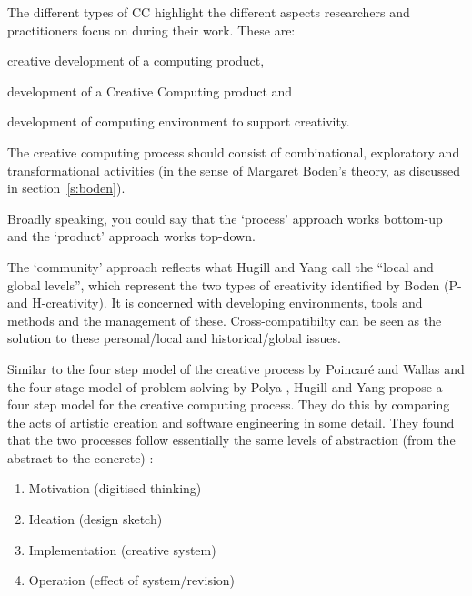 The different types of \ac{CC} highlight the different aspects researchers and practitioners focus on during their work. These are:

\begin{description}[leftmargin=1.7cm]
  \item [Process] creative development of a computing product,
  \item [Product] development of a Creative Computing product and
  \item [Community] development of computing environment to support creativity.
\end{description}

The creative computing process should consist of combinational, exploratory and transformational activities (in the sense of Margaret Boden’s theory, as discussed in section~\ref{s:boden}).

Broadly speaking, you could say that the `process' approach works bottom-up and the `product' approach works top-down.

The `community' approach reflects what Hugill and Yang call the ``local and global levels'', which represent the two types of creativity identified by Boden (P- and H-creativity). It is concerned with developing environments, tools and methods and the management of these. Cross-compatibilty can be seen as the solution to these personal/local and historical/global issues.

Similar to the four step model of the creative process by Poincar{\'e} and Wallas \citeyear{Poincare2001, Wallas1926} and the four stage model of problem solving by Polya \citeyear{Polya1957}, Hugill and Yang propose a four step model for the creative computing process. They do this by comparing the acts of artistic creation and software engineering in some detail. They found that the two processes follow essentially the same levels of abstraction (from the abstract to the concrete) \autocite[p.15]{Hugill2013c}:

\begin{enumerate}
  \item Motivation (digitised thinking)
  \item Ideation (design sketch)
  \item Implementation (creative system)
  \item Operation (effect of system/revision)
\end{enumerate}

